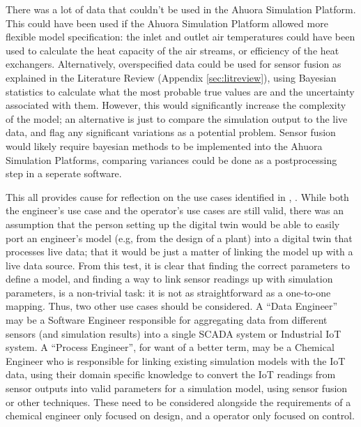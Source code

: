 There was a lot of data that couldn't be used in the Ahuora Simulation Platform. This could have been used if the Ahuora Simulation Platform allowed more flexible model specification: the inlet and outlet air temperatures could have been used to calculate the heat capacity of the air streams, or efficiency of the heat exchangers.
Alternatively, overspecified data could be used for sensor fusion as explained in the Literature Review (Appendix \ref{sec:litreview}), using Bayesian statistics to calculate what the most probable true values are and the uncertainty associated with them. 
However, this would significantly increase the complexity of the model; an alternative is just to compare the simulation output to the live data, and flag any significant variations as a potential problem. 
Sensor fusion would likely require bayesian methods to be implemented into the Ahuora Simulation Platforms, comparing variances could be done as a postprocessing step in a seperate software.

This all provides cause for reflection on the use cases identified in , . While both the engineer's use case and the operator's use cases are still valid, there was an assumption that the person setting up the digital twin would be able to easily port an engineer's model (e.g, from the design of a plant) into a digital twin that processes live data; that it would be just a matter of linking the model up with a live data source. From this test, it is clear that finding the correct parameters to define a model, and finding a way to link sensor readings up with simulation parameters, is a non-trivial task: it is not as straightforward as a one-to-one mapping. Thus, two other use cases should be considered. A ``Data Engineer'' may be a Software Engineer responsible for aggregating data from different sensors (and simulation results) into a single SCADA system or Industrial IoT system. A ``Process Engineer'', for want of a better term, may be a Chemical Engineer who is responsible for linking existing simulation models with the IoT data, using their domain specific knowledge to convert the IoT readings from sensor outputs into valid parameters for a simulation model, using sensor fusion or other techniques. These need to be considered alongside the requirements of a chemical engineer only focused on design, and a operator only focused on control.

